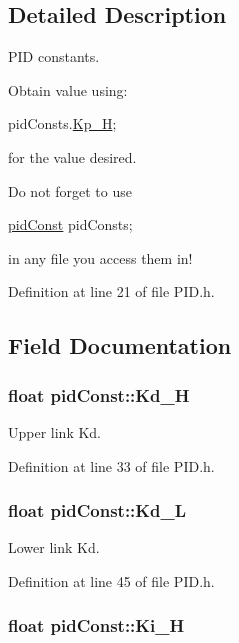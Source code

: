 \subsection{Detailed Description}
P\-I\-D constants. 

Obtain value using\-:
\begin{DoxyCode}
pidConsts.\hyperlink{structpid_const_ae2c7d62f4fd919c89233a39e1a84b2db}{Kp\_H}; 
\end{DoxyCode}
 for the value desired.

Do not forget to use
\begin{DoxyCode}
\hyperlink{structpid_const}{pidConst} pidConsts; 
\end{DoxyCode}
 in any file you access them in! 

Definition at line 21 of file P\-I\-D.\-h.



\subsection{Field Documentation}
\hypertarget{structpid_const_a239f5a849b57db2f52fe4e44aa979e2f}{
\subsubsection[{Kd\-\_\-\-H}]{\setlength{\rightskip}{0pt plus 5cm}float pid\-Const\-::\-Kd\-\_\-\-H}}\label{structpid_const_a239f5a849b57db2f52fe4e44aa979e2f}


Upper link Kd. 



Definition at line 33 of file P\-I\-D.\-h.

\hypertarget{structpid_const_ab1d5ff1148dc4f1b174757fe513bc368}{
\subsubsection[{Kd\-\_\-\-L}]{\setlength{\rightskip}{0pt plus 5cm}float pid\-Const\-::\-Kd\-\_\-\-L}}\label{structpid_const_ab1d5ff1148dc4f1b174757fe513bc368}


Lower link Kd. 



Definition at line 45 of file P\-I\-D.\-h.

\hypertarget{structpid_const_a2d06f9407c1fd682baa8519e5744384a}{
\subsubsection[{Ki\-\_\-\-H}]{\setlength{\rightskip}{0pt plus 5cm}float pid\-Const\-::\-Ki\-\_\-\-H}}\label{structpid_const_a2d06f9407c1fd682baa8519e5744384a}


